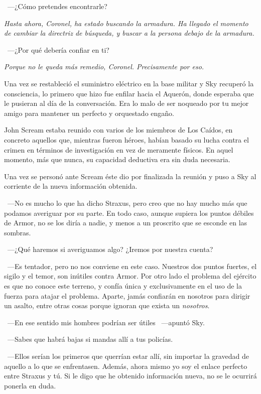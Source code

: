 ~---¿Cómo pretendes encontrarle?

\emph{Hasta ahora, Coronel, ha estado buscando la armadura. Ha llegado el momento de cambiar la directriz de búsqueda, y buscar a la persona debajo de la armadura.}

~---¿Por qué debería confiar en ti?

\emph{Porque no le queda más remedio, Coronel. Precisamente por eso.}

\parbreak
Una vez se restableció el suministro eléctrico en la base militar y Sky recuperó la consciencia, lo primero que hizo fue enfilar hacia el Aquerón, donde esperaba que le pusieran al día de la conversación. Era lo malo de ser noqueado por tu mejor amigo para mantener un perfecto y orquestado engaño.

John Scream estaba reunido con varios de los miembros de Los Caídos, en concreto aquellos que, mientras fueron héroes, habían basado su lucha contra el crimen en términos de investigación en vez de meramente físicos. En aquel momento, más que nunca, su capacidad deductiva era sin duda necesaria.

Una vez se personó ante Scream éste dio por finalizada la reunión y puso a Sky al corriente de la nueva información obtenida.

~---No es mucho lo que ha dicho Straxus, pero creo que no hay mucho más que podamos averiguar por su parte. En todo caso, aunque supiera los puntos débiles de Armor, no se los diría a nadie, y menos a un proscrito que se esconde en las sombras.

~---¿Qué haremos si averiguamos algo? ¿Iremos por nuestra cuenta?

~---Es tentador, pero no nos conviene en este caso. Nuestros dos puntos fuertes, el sigilo y el temor, son inútiles contra Armor. Por otro lado el problema del ejército es que no conoce este terreno, y confía única y exclusivamente en el uso de la fuerza para atajar el problema. Aparte, jamás confiarán en nosotros para dirigir un asalto, entre otras cosas porque ignoran que exista un \emph{nosotros}.

~---En ese sentido mis hombres podrían ser útiles ~---apuntó Sky.

~---Sabes que habrá bajas si mandas allí a tus policías.

~---Ellos serían los primeros que querrían estar allí, sin importar la gravedad de aquello a lo que se enfrentasen. Además, ahora mismo yo soy el enlace perfecto entre Straxus y tú. Si le digo que he obtenido información nueva, no se le ocurrirá ponerla en duda.

